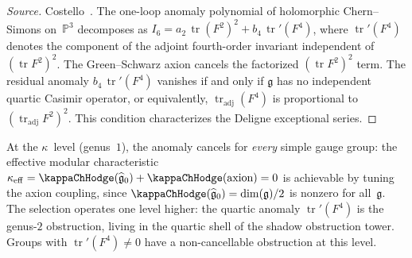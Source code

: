 \begin{proof}[Source]
Costello~\cite{Costello2111}.
The one-loop anomaly polynomial of holomorphic Chern--Simons
on~$\mathbb{P}^3$ decomposes as
$I_6 = a_2\,\operatorname{tr}(F^2)^2
+ b_4\,\operatorname{tr}'(F^4)$,
where $\operatorname{tr}'(F^4)$ denotes the component of the
adjoint fourth-order invariant independent of
$(\operatorname{tr} F^2)^2$.
The Green--Schwarz axion cancels the factorized
$(\operatorname{tr} F^2)^2$ term. The residual anomaly
$b_4\,\operatorname{tr}'(F^4)$ vanishes if and only if
$\mathfrak{g}$ has no independent quartic Casimir operator, or
equivalently,
$\operatorname{tr}_{\mathrm{adj}}(F^4)$ is proportional to
$(\operatorname{tr}_{\mathrm{adj}} F^2)^2$.
This condition characterizes the Deligne exceptional
series.
\end{proof}

\begin{remark}
\label{rem:ht-twistor-genus-level}
At the $\kappa$~level (genus~$1$), the anomaly cancels for
\emph{every} simple gauge group: the effective modular
characteristic
$\kappa_{\mathrm{eff}} = \kappaChHodge(\widehat{\mathfrak{g}}_0)
+ \kappaChHodge(\text{axion}) = 0$
is achievable by tuning the axion coupling, since
$\kappaChHodge(\widehat{\mathfrak{g}}_0) = \dim(\mathfrak{g})/2$
is nonzero for all~$\mathfrak{g}$.
The selection operates one level higher: the quartic
anomaly $\operatorname{tr}'(F^4)$ is the genus-$2$
obstruction, living in the quartic shell of the shadow
obstruction tower. Groups with
$\operatorname{tr}'(F^4) \neq 0$ have a non-cancellable
obstruction at this level.
\end{remark}


